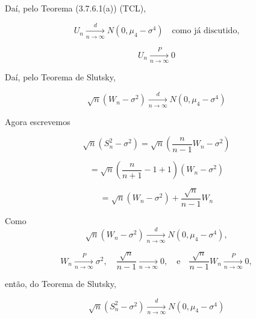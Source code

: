 Daí, pelo Teorema (3.7.6.1(a)) (TCL),

\begin{equation}
U_n \xrightarrow[n \to \infty]{d} N(0, \mu_4 - \sigma^4) \quad \text{como já discutido,}
\end{equation}

\begin{equation}
U_n \xrightarrow[n \to \infty]{P} 0
\end{equation}

Daí, pelo Teorema de Slutsky,

\begin{equation}
\sqrt{n} \left( W_n - \sigma^2 \right) \xrightarrow[n \to \infty]{d} N(0, \mu_4 - \sigma^4)
\end{equation}

Agora escrevemos

\begin{equation}
\sqrt{n} \left( S_n^2 - \sigma^2 \right) = \sqrt{n} \left( \frac{n}{n-1} W_n - \sigma^2 \right)
\end{equation}

\begin{equation}
= \sqrt{n} \left( \frac{n}{n+1} - 1 + 1 \right) \left( W_n - \sigma^2 \right)
\end{equation}

\begin{equation}
= \sqrt{n} \left( W_n - \sigma^2 \right) + \frac{\sqrt{n}}{n-1} W_n
\end{equation}

Como 
\begin{equation}
\sqrt{n} \left( W_n - \sigma^2 \right) \xrightarrow[n \to \infty]{d} N(0, \mu_4 - \sigma^4),
\end{equation}

\begin{equation}
W_n \xrightarrow[n \to \infty]{P} \sigma^2, \quad \frac{\sqrt{n}}{n-1} \xrightarrow[n \to \infty]{} 0, \quad \text{e} \quad \frac{\sqrt{n}}{n-1} W_n \xrightarrow[n \to \infty]{P} 0,
\end{equation}

então, do Teorema de Slutsky,

\begin{equation}
\sqrt{n} \left( S_n^2 - \sigma^2 \right) \xrightarrow[n \to \infty]{d} N(0, \mu_4 - \sigma^4)
\end{equation}